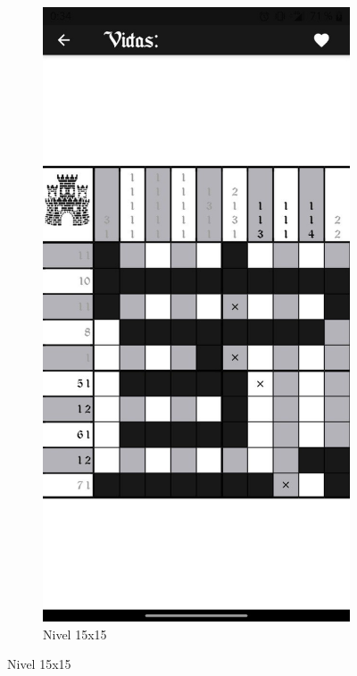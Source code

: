   \begin{figure}[H]
    \centering
    \begin{subfigure}[b]{0.45\linewidth}
      \includegraphics[width=\linewidth]{images/man6.jpeg}
      \caption{Nivel 15x15}
      \label{fig:man1-6}

\end{subfigure}
\end{figure}
